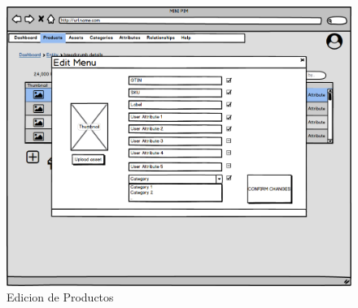 \begin{figure}[H]
    \includegraphics[width=1\linewidth]{mockups/RF2-X Editar ProductoV2.png}
    \caption{Edicion de Productos}
   \end{figure}
\vspace{1.0cm}

\newpage %